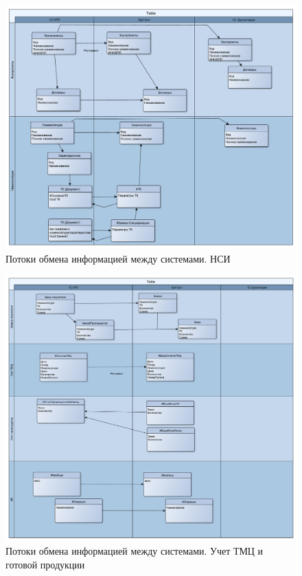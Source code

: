 \begin{figure}[htb]
\begin{center}
   \includegraphics[height=0.8\textheight, width=1\textwidth, angle=0,  keepaspectratio]{50_Pics/DFD.pdf}
\end{center}
   \caption{Потоки обмена информацией между системами. НСИ}
   \label{pic:DFD}
\end{figure}
\FloatBarrier

\begin{figure}[htb]
\begin{center}
  \includegraphics[height=0.8\textheight, width=1\textwidth, angle=0,  keepaspectratio]{50_Pics/DFD_2.pdf}
\end{center}
  \caption{Потоки обмена информацией между системами. Учет ТМЦ и готовой продукции}
  \label{pic:DFD_2}
\end{figure}
\FloatBarrier




